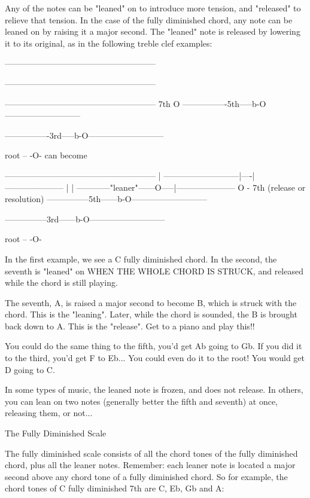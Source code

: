 Any of the notes can be "leaned" on to introduce more tension, and "released"
to relieve that tension. In the case of the fully diminished chord, any note
can be leaned on by raising it a major second. The "leaned" note is released
by lowering it to its original, as in the following treble clef examples:


------------------------------------------------------

------------------------------------------------------

------------------------------------------------------
                   7th      O
----------------5th-----b-O---------------------------

----------------3rd-----b-O---------------------------

               root  --  -O-
can become


------------------------------------------------------
                           |
---------------------------|----|---------------------
                           |    |
------------"leaner"------O-----|---------------------
                               O  - 7th (release or resolution)
---------------5th------b-O---------------------------

---------------3rd------b-O---------------------------

              root  --   -O-


In the first example, we see a C fully diminished chord. In the second, the
seventh is "leaned" on WHEN THE WHOLE CHORD IS STRUCK, and released while the
chord is still playing.

The seventh, A, is raised a major second to become B, which is struck with the
chord. This is the "leaning". Later, while the chord is sounded, the B is
brought back down to A. This is the "release". Get to a piano and play this!!

You could do the same thing to the fifth, you'd get Ab going to Gb. If you did
it to the third, you'd get F to Eb... You could even do it to the root! You
would get D going to C.

In some types of music, the leaned note is frozen, and does not release. In
others, you can lean on two notes (generally better the fifth and seventh) at
once, releasing them, or not...

The Fully Diminished Scale

The fully diminished scale consists of all the chord tones of the fully
diminished chord, plus all the leaner notes. Remember: each leaner note is
located a major second above any chord tone of a fully diminished chord.
So for example, the chord tones of C fully diminished 7th are C, Eb, Gb and A:

